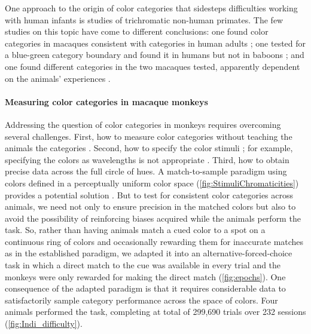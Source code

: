 One approach to the origin of color categories that sidesteps difficulties working with human infants is studies of trichromatic non-human primates. 
The few studies on this topic have come to different conclusions: one found color categories in macaques consistent with categories in human adults \citep{sandell_color_1979}; one tested for a blue-green category boundary and found it in humans but not in baboons \citep{fagot_cross-species_2006}; and one found different categories in the two macaques tested, apparently dependent on the animals’ experiences \citep{panichello_error-correcting_2019}.

\paragraph{Measuring color categories in macaque monkeys}

Addressing the question of color categories in monkeys requires overcoming several challenges. 
First, how to measure color categories without teaching the animals the categories \citep{essock_color_1977,matsuno_color_2004}.
Second, how to specify the color stimuli \citep{siuda-krzywicka_biological_2019}; for example, specifying the colors as wavelengths \citep{sandell_color_1979}
is not appropriate \citep{davidoff_cross-species_2010}. 
Third, how to obtain precise data across the full circle of hues. 
A match-to-sample paradigm using colors defined in a perceptually uniform color space (\autoref{fig:StimuliChromaticities}) provides a potential solution \citep{bae_why_2015,panichello_error-correcting_2019}.
But to test for consistent color categories across animals, we need not only to ensure precision in the matched colors but also to avoid the possibility of reinforcing biases acquired while the animals perform the task. 
So, rather than having animals match a cued color to a spot on a continuous ring of colors and occasionally rewarding them for inaccurate matches as in the established paradigm, we adapted it into an alternative-forced-choice task in which a direct match to the cue was available in every trial and the monkeys were only rewarded for making the direct match (\autoref{fig:epochs}). 
One consequence of the adapted paradigm is that it requires considerable data to satisfactorily sample category performance across the space of colors. 
Four animals performed the task, completing at total of 299,690 trials over 232 sessions (\ref{fig:Indi_difficulty}).

